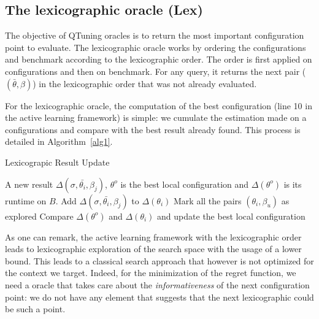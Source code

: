 \documentclass[10pt, conference, compsocconf]{IEEEtran}
\begin{document}
\subsection{The lexicographic  oracle (Lex)}

The objective of QTuning oracles is to return the most important
configuration point to evaluate.  The lexicographic oracle works by
ordering the configurations and benchmark according to the
lexicographic order.  The order is first applied on configurations and
then on benchmark. For any query, it returns the next pair
($(\bar{\theta}, \beta)$) in the lexicographic order that was not
already evaluated.

For the lexicographic oracle, the computation of the best
configuration (line 10 in the active learning framework) is simple: we
cumulate the estimation made on a configurations and compare with the
best result already found.  This process is detailed in
Algorithm~\ref{alg1}.

	\begin{algorithm}                    
	\caption{\scriptsize Lexicograpic Result Update } 	\label{alg1}  
	\begin{algorithmic}[1]
	\scriptsize
         A new result  $\Delta(\sigma, \bar{\theta_i}, \beta_j)$, 
         $\theta^o$ is the best local configuration and $\Delta(\theta^o)$ is its runtime on $B$.
        \STATE Add $\Delta(\sigma, \bar{\theta_i}, \beta_j)$ to $\Delta(\theta_i)$
        \STATE Mark all the pairs $(\theta_i, \beta_u)$ as explored
        \ELSE
        \STATE Compare $\Delta(\theta^o)$ and $\Delta(\theta_i)$ and update the best local configuration
        \ENDIF
	\ENDIF
	\end{algorithmic}
	\end{algorithm}
	\normalsize

        As one can remark, the active learning framework with the
        lexicographic order leads to lexicographic exploration of the
        search space with the usage of a lower bound. This leads to a
        classical search approach that however is not optimized for
        the context we target. Indeed, for the minimization of the
        regret function, we need a oracle that takes care about the
        {\it informativeness} of the next configuration point: we do
        not have any element that suggests that the next lexicographic
        could be such a point.
\end{document}
